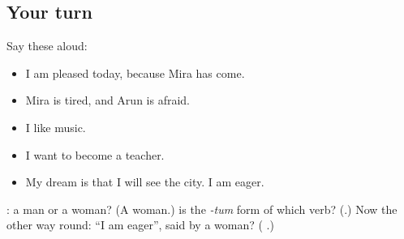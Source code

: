 \subsection*{Your turn}
Say these aloud:

\begin{itemize}
\raggedright
  \item I am pleased today, because Mira has come.
  \item Mira is tired, and Arun is afraid.
  \item I like music.
  \item I want to become a teacher.
  \item My dream is that I will see the city. I am eager.
\end{itemize}

\begin{tcolorbox}[breakable,colback=teal!4,colframe=teal!35!black,title={Before you move on}]
\textbf{}: a man or a woman? (A woman.) \textbf{} is the \emph{-tum} form of which verb? (\textbf{}.) Now the other way round: \textquotedblleft{}I am eager\textquotedblright{}, said by a woman? (\textbf{  }.)
\end{tcolorbox}
